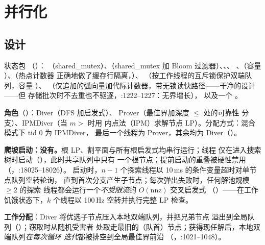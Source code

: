 \documentclass[11pt]{ctexart}
\newcommand{\nnz}{\mathrm{nnz}}
\begin{document}
\section{并行化}
\label{sec:parallel}

\subsection{设计}
状态包 
（）：
（shared\_mutex）、（shared\_mutex 加 Bloom
过滤器）、、、
、（容量
）、（热点计数器
正确地做了缓存行隔离，）、
（按工作线程的互斥锁保护双端队列，容量
）、
（仅追加的弧向量加代际计数器，带无锁读快路径——干净的设计——但
 存储批次时不去重也不驱逐，:1222--1227：无界增长），
以及一个 。

\textbf{角色}（）：Diver（DFS 加启发式）、
Prover（最佳界加深度 $\le$  处的可靠性
分支）、IPMDiver（当 $m > $  时用
内点法（IPM）求解节点 LP）。分配方式：混合模式下 tid 0 为 IPMDiver，
最后一个线程为 Prover，其余均为 Diver（）。

\textbf{爬坡启动：没有。}根 LP、割平面与所有根启发式均串行运行；线程
仅在进入搜索树时启动（），此时共享队列中只有
一个根节点；提前启动的重叠被硬性禁用
（，:18025--18026）。
启动时，$n-1$ 个探索线程以 10\,ms 的条件变量超时对单节点队列空转轮询，
直到首次分支产生子节点；每次弹出失败时，任何解池规模 $\ge 2$ 的探索
线程都会运行一个\emph{不受限流}的 $O(\nnz)$ 交叉启发式
（）——在工作饥饿状态下，$k$ 个线程以
100\,Hz 空转并执行完整 LP 检查。

\textbf{工作分配}：Diver 将优选子节点压入本地双端队列，并把兄弟节点
溢出到全局队列（）；窃取时从随机受害者
处取走最旧的（队首）节点；获得现任解后，本地双端队列\emph{在每次循环
迭代}都被排空到全局最佳界前沿
（，:1021--1048）。
\end{document}
